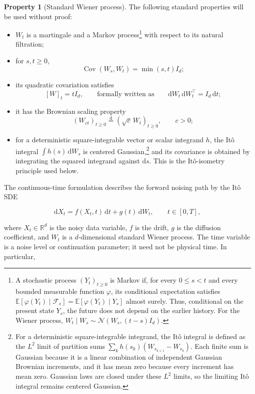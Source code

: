 \documentclass[11pt,a4paper]{article}
\theoremstyle{definition}
\newtheorem{property}[definition]{Property}
\begin{document}
\begin{property}[Standard Wiener process]
The following standard properties will be used without proof:
\begin{itemize}
    \item $W_t$ is a martingale and a Markov process\footnote{A stochastic process
    $(Y_t)_{t\geq0}$ is Markov if, for every $0\leq s<t$ and every bounded measurable
    function $\varphi$, its conditional expectation satisfies
    $\mathbb{E}[\varphi(Y_t)\mid\mathcal{F}_s]
    =\mathbb{E}[\varphi(Y_t)\mid Y_s]$ almost surely. Thus, conditional on the present
    state $Y_s$, the future does not depend on the earlier history. For the Wiener process,
    $W_t\mid W_s\sim\mathcal{N}(W_s,(t-s)I_d)$.} with respect to its natural
    filtration;
    \item for $s,t\geq0$,
    \[
    \operatorname{Cov}(W_s,W_t)=\min(s,t)I_d;
    \]
    \item its quadratic covariation satisfies
    \[
    [W]_t=tI_d,
    \qquad\text{formally written as}\qquad
    \mathrm{d}W_t\,\mathrm{d}W_t^{\top}=I_d\,\mathrm{d}t;
    \]
    \item it has the Brownian scaling property
    \[
    (W_{ct})_{t\geq0}\overset{\mathrm{d}}{=}
    (\sqrt{c}\,W_t)_{t\geq0},
    \qquad c>0;
    \]
    \item for a deterministic square-integrable vector or scalar integrand $h$, the It\^o
    integral $\int h(s)\,\mathrm{d}W_s$ is centered Gaussian,\footnote{For a deterministic
    square-integrable integrand, the It\^o integral is defined as the $L^2$ limit of partition
    sums $\sum_k h(s_k)(W_{s_{k+1}}-W_{s_k})$. Each finite sum is Gaussian because it is a
    linear combination of independent Gaussian Brownian increments, and it has mean zero
    because every increment has mean zero. Gaussian laws are closed under these $L^2$ limits,
    so the limiting It\^o integral remains centered Gaussian.} and its covariance is
    obtained by integrating the squared integrand against $\mathrm{d}s$. This is the
    It\^o-isometry principle used below.
\end{itemize}
\end{property}

The continuous-time formulation describes the forward noising path by the It\^o SDE

\[
\mathrm{d}X_t=f(X_t,t)\,\mathrm{d}t+g(t)\,\mathrm{d}W_t,
\qquad
t\in[0,T],
\]

where $X_t\in\mathbb{R}^d$ is the noisy data variable, $f$ is the drift, $g$ is the
diffusion coefficient, and $W_t$ is a $d$-dimensional standard Wiener process. The time
variable is a noise level or continuation parameter; it need not be physical time. In
particular,
\end{document}
